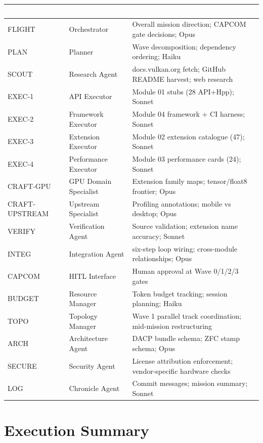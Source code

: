 \documentclass[11pt,letterpaper]{article}
\newcommand{\tableheader}[1]{\textbf{\sffamily\textcolor{white}{#1}}}
\begin{document}
\begin{center}
\begin{tabularx}{\textwidth}{L{2cm}L{3cm}X}
\toprule
{}
\tableheader{Role} & \tableheader{Agent} & \tableheader{Responsibility} \\
\midrule
FLIGHT & Orchestrator & Overall mission direction; CAPCOM gate decisions; Opus \\
PLAN & Planner & Wave decomposition; dependency ordering; Haiku \\
SCOUT & Research Agent & docs.vulkan.org fetch; GitHub README harvest; web research \\
EXEC-1 & API Executor & Module 01 stubs (28 API+Hpp); Sonnet \\
EXEC-2 & Framework Executor & Module 04 framework + CI harness; Sonnet \\
EXEC-3 & Extension Executor & Module 02 extension catalogue (47); Sonnet \\
EXEC-4 & Performance Executor & Module 03 performance cards (24); Sonnet \\
CRAFT-GPU & GPU Domain Specialist & Extension family maps; tensor/float8 frontier; Opus \\
CRAFT-UPSTREAM & Upstream Specialist & Profiling annotations; mobile vs desktop; Opus \\
VERIFY & Verification Agent & Source validation; extension name accuracy; Sonnet \\
INTEG & Integration Agent & six-step loop wiring; cross-module relationships; Opus \\
CAPCOM & HITL Interface & Human approval at Wave 0/1/2/3 gates \\
BUDGET & Resource Manager & Token budget tracking; session planning; Haiku \\
TOPO & Topology Manager & Wave 1 parallel track coordination; mid-mission restructuring \\
ARCH & Architecture Agent & DACP bundle schema; ZFC stamp schema; Opus \\
SECURE & Security Agent & License attribution enforcement; vendor-specific hardware checks \\
LOG & Chronicle Agent & Commit messages; mission summary; Sonnet \\
\bottomrule
\end{tabularx}
\end{center}

\section{Execution Summary}
\end{document}
